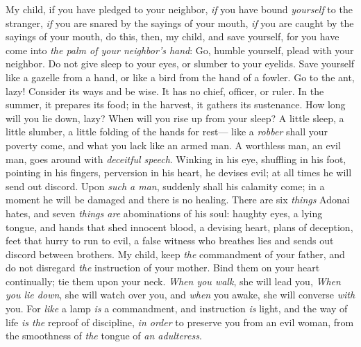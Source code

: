 \begin{biblechapter} %
 My child, if you have pledged to your neighbor, 
\textit{if} you have bound \textit{yourself} to the stranger,
\verse \textit{if} you are snared by the sayings of your mouth, 
\textit{if} you are caught by the sayings of your mouth,
\verse do this, then, my child, and save yourself, 
for you have come into \textit{the palm of your neighbor’s hand}: 
Go, humble yourself, plead with your neighbor.
\verse Do not give sleep to your eyes, 
or slumber to your eyelids.
\verse Save yourself like a gazelle from a hand, 
or like a bird from the hand of a fowler.
 Go to the ant, lazy! 
Consider its ways and be wise.
\verse It has no chief, 
officer, or ruler.
\verse In the summer, it prepares its food; 
in the harvest, it gathers its sustenance.
\verse How long will you lie down, lazy? 
When will you rise up from your sleep?
\verse A little sleep, a little slumber, 
a little folding of the hands for rest—
\verse like a \textit{robber} shall your poverty come, 
and what you lack like an armed man.
 A worthless man, an evil man, 
goes around with \textit{deceitful speech}.
\verse Winking in his eye, shuffling in his foot, 
pointing in his fingers,
\verse perversion in his heart, he devises evil; 
at all times he will send out discord.
\verse Upon \textit{such a man}, suddenly shall his calamity come; 
in a moment he will be damaged and there is no healing.
 There are six \textit{things} Adonai hates, 
and seven \textit{things are} abominations of his soul:
\verse haughty eyes, a lying tongue, 
and hands that shed innocent blood,
\verse a devising heart, plans of deception, 
feet that hurry to run to evil,
\verse a false witness who breathes lies 
and sends out discord between brothers.
 My child, keep \textit{the} commandment of your father, 
and do not disregard \textit{the} instruction of your mother.
\verse Bind them on your heart continually; 
tie them upon your neck.
\verse \textit{When you walk}, she will lead you, 
\textit{When you lie down}, she will watch over you, 
and \textit{when} you awake, she will converse \textit{with} you.
\verse For \textit{like} a lamp \textit{is} a commandment, and instruction \textit{is} light, 
and the way of life \textit{is the} reproof of discipline,
\verse \textit{in order} to preserve you from an evil woman, 
from the smoothness of \textit{the} tongue of \textit{an adulteress}.

\end{biblechapter}
